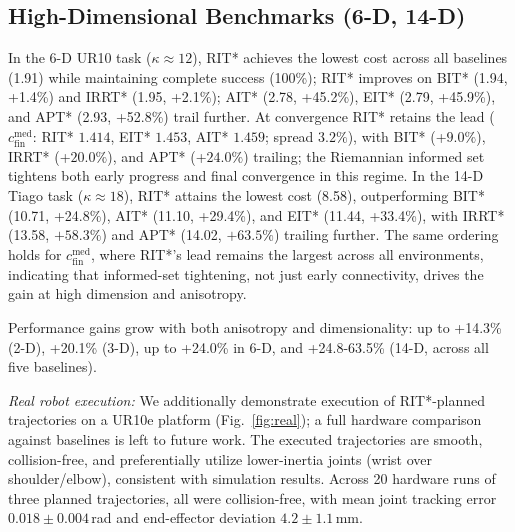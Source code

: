 \documentclass[journal]{IEEEtran}
\begin{document}
\subsection{High-Dimensional Benchmarks (6-D, 14-D)}

In the 6-D UR10 task ($\kappa\!\approx\!12$), RIT* achieves the
lowest cost across all baselines (1.91) while maintaining complete success
(100\%); RIT* improves on BIT* (1.94, +1.4\%) and IRRT*
(1.95, +2.1\%); AIT* (2.78, +45.2\%), EIT* (2.79, +45.9\%), and APT* (2.93, +52.8\%) trail further. At convergence RIT* retains the lead ($c^{\mathrm{med}}_{\mathrm{fin}}$: RIT* $1.414$, EIT* $1.453$, AIT* $1.459$; spread $3.2\%$), with BIT* (+$9.0\%$), IRRT* (+$20.0\%$), and APT* (+$24.0\%$) trailing; the Riemannian informed set tightens both early progress and final convergence in this regime.
In the 14-D Tiago task ($\kappa\!\approx\!18$), RIT* attains
the lowest cost (8.58),
outperforming BIT* (10.71, +24.8\%), AIT* (11.10, +29.4\%), and
EIT* (11.44, +33.4\%), with IRRT* (13.58, $+58.3\%$) and APT* (14.02, $+63.5\%$) trailing further. The same ordering holds for $c^{\mathrm{med}}_{\mathrm{fin}}$, where RIT*'s lead remains the largest across all environments, indicating that informed-set tightening, not just early connectivity, drives the gain at high dimension and anisotropy.

Performance gains grow
with both anisotropy and dimensionality: up to +14.3\% (2-D),
+20.1\% (3-D), up to +24.0\% in 6-D, and +24.8-63.5\% (14-D, across all five baselines).

\textit{Real robot execution:}
We additionally demonstrate execution of RIT*-planned trajectories on a UR10e platform (Fig.~\ref{fig:real}); a full hardware comparison against baselines is left to future work. The executed trajectories are smooth, collision-free, and preferentially utilize lower-inertia joints (wrist over shoulder/elbow), consistent with simulation results. Across 20 hardware runs of three planned trajectories, all were collision-free, with mean joint tracking error $0.018\pm0.004$\,rad and end-effector deviation $4.2\pm1.1$\,mm.
\end{document}
